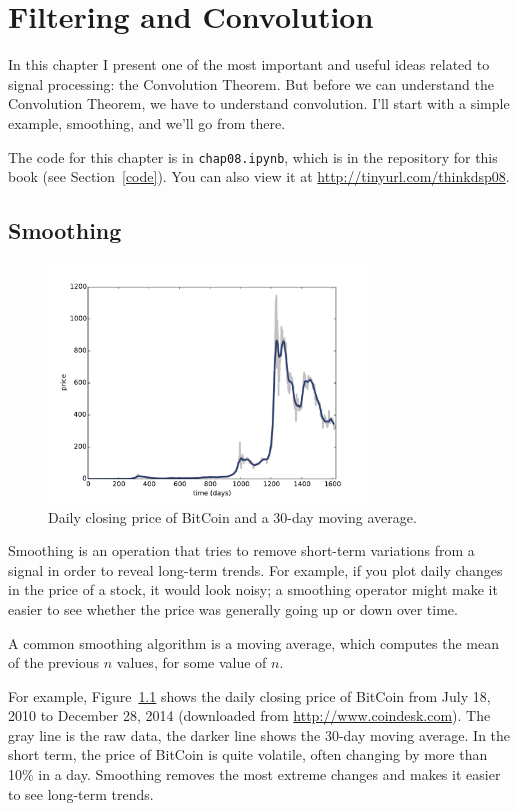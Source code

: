 \documentclass[12pt]{book}
\begin{document}
\chapter{Filtering and Convolution}

In this chapter I present one of the most important and useful
ideas related to signal processing: the Convolution Theorem.
But before we can understand the Convolution Theorem, we have to understand
convolution.  I'll start with a simple example, smoothing, and
we'll go from there.

The code for this chapter is in {\tt chap08.ipynb}, which is in the
repository for this book (see Section~\ref{code}).
You can also view it at \url{http://tinyurl.com/thinkdsp08}.


\section{Smoothing}
\label{smoothing}

\begin{figure}
\centerline{\includegraphics[height=2.5in]{figs/convolution1.pdf}}
\caption{Daily closing price of BitCoin and a 30-day moving
average.}
\label{fig.convolution1}
\end{figure}

Smoothing is an operation that tries to remove short-term variations
from a signal in order to reveal long-term trends.  For example, if
you plot daily changes in the price of a stock, it would look noisy;
a smoothing operator might make it easier to see whether the price
was generally going up or down over time.  

A common smoothing algorithm is a moving average, which computes
the mean of the previous $n$ values, for some value of $n$.

For example, Figure~\ref{fig.convolution1} shows the daily
closing price of BitCoin from July 18, 2010 to December 28,
2014 (downloaded from \url{http://www.coindesk.com}).  The gray line
is the raw data, the darker line shows the 30-day moving average.
In the short term, the price of BitCoin is quite volatile, often
changing by more than 10\% in a day.  Smoothing removes the most
extreme changes and makes it easier to see long-term trends.
\end{document}
